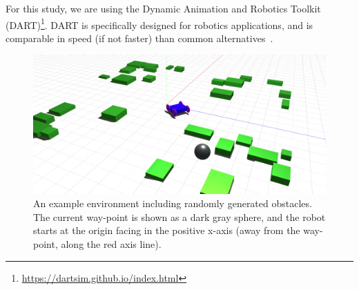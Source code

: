 For this study, we are using the Dynamic Animation and Robotics Toolkit (DART)\footnote{\url{https://dartsim.github.io/index.html}}.
%
DART is specifically designed for robotics applications,
and is comparable in speed (if not faster) than common alternatives~\citep{Mouret.2017.SimER.Simulation}.
%
%


\begin{figure}[!ht]
    \centering

    \includegraphics[width=0.8\columnwidth]{figures/3-adabot/environment.png}


    \caption{An example environment including randomly generated obstacles. The current way-point is shown as a dark gray sphere, and the robot starts at the origin facing in the positive x-axis (away from the way-point, along the red axis line).}
    \label{fig:simulation-environment}


\end{figure}

